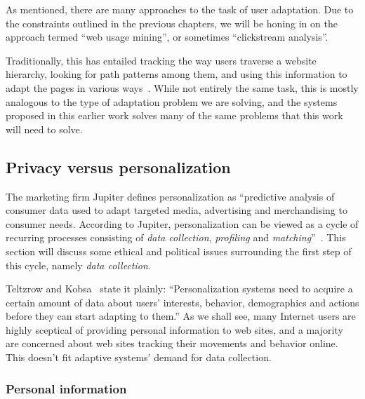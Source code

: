 As mentioned, there are many approaches to the task of user adaptation. Due to the constraints outlined in the previous chapters, we will be honing in on the approach termed ``web usage mining'', or sometimes ``clickstream analysis''.

Traditionally, this has entailed tracking the way users traverse a website hierarchy, looking for path patterns among them, and using this information to adapt the pages in various ways~\cite{Mobasher2000,Eirinaki2003,Montgomery2009}. While not entirely the same task, this is mostly analogous to the type of adaptation problem we are solving, and the systems proposed in this earlier work solves many of the same problems that this work will need to solve.

%
%

\subsection{Privacy versus personalization}
\label{survey:sec:privacy_vs_personalization}

The marketing firm Jupiter defines personalization as ``predictive analysis of consumer data used to adapt targeted media, advertising and merchandising to consumer needs. According to Jupiter, personalization can be viewed as a cycle of recurring processes consisting of \emph{data collection}, \emph{profiling} and \emph{matching}''~\cite{Foster2000}. This section will discuss some ethical and political issues surrounding the first step of this cycle, namely \emph{data collection}.

Teltzrow and Kobsa~\cite{Teltzrow2004} state it plainly: ``Personalization systems need to acquire a certain amount of data about users' interests, behavior, demographics and actions before they can start adapting to them.'' As we shall see, many Internet users are highly sceptical of providing personal information to web sites, and a majority are concerned about web sites tracking their movements and behavior online. This doesn't fit adaptive systems' demand for data collection.

\subsubsection{Personal information}

